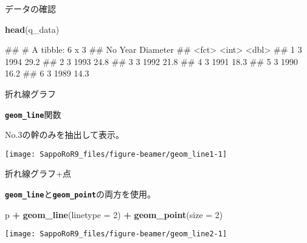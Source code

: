 \documentclass[ignorenonframetext,]{beamer}
\newenvironment{Shaded}{\begin{snugshade}}{\end{snugshade}}
\newcommand{\KeywordTok}[1]{\textcolor[rgb]{0.13,0.29,0.53}{\textbf{#1}}}
\newcommand{\DataTypeTok}[1]{\textcolor[rgb]{0.13,0.29,0.53}{#1}}
\newcommand{\DecValTok}[1]{\textcolor[rgb]{0.00,0.00,0.81}{#1}}
\newcommand{\StringTok}[1]{\textcolor[rgb]{0.31,0.60,0.02}{#1}}
\newcommand{\OperatorTok}[1]{\textcolor[rgb]{0.81,0.36,0.00}{\textbf{#1}}}
\newcommand{\NormalTok}[1]{#1}
\let\oldShaded\Shaded
\let\endoldShaded\endShaded
\renewenvironment{Shaded}{\footnotesize\oldShaded}{\endoldShaded}
\let\oldverbatim\verbatim
\let\endoldverbatim\endverbatim
\renewenvironment{verbatim}{\footnotesize\oldverbatim}{\endoldverbatim}
\begin{document}
\begin{frame}[fragile]{データの確認}

\begin{Shaded}
\begin{Highlighting}[]
\KeywordTok{head}\NormalTok{(q_data)}
\end{Highlighting}
\end{Shaded}

\begin{verbatim}
## # A tibble: 6 x 3
##   No     Year Diameter
##   <fct> <int>    <dbl>
## 1 3      1994     29.2
## 2 3      1993     24.8
## 3 3      1992     21.8
## 4 3      1991     18.3
## 5 3      1990     16.2
## 6 3      1989     14.3
\end{verbatim}

\end{frame}

\begin{frame}[fragile]{折れ線グラフ}

\textbf{\texttt{geom\_line}}関数

No.3の幹のみを抽出して表示。

\begin{Shaded}
\end{Shaded}

\texttt{[image: SappoRoR9\_files/figure-beamer/geom\_line1-1]}

\end{frame}

\begin{frame}[fragile]{折れ線グラフ+点}

\textbf{\texttt{geom\_line}}と\textbf{\texttt{geom\_point}}の両方を使用。

\begin{Shaded}
\begin{Highlighting}[]
\NormalTok{p }\OperatorTok{+}\StringTok{ }\KeywordTok{geom_line}\NormalTok{(}\DataTypeTok{linetype =} \DecValTok{2}\NormalTok{) }\OperatorTok{+}\StringTok{ }\KeywordTok{geom_point}\NormalTok{(}\DataTypeTok{size =} \DecValTok{2}\NormalTok{)}
\end{Highlighting}
\end{Shaded}

\texttt{[image: SappoRoR9\_files/figure-beamer/geom\_line2-1]}

\end{frame}
\end{document}

